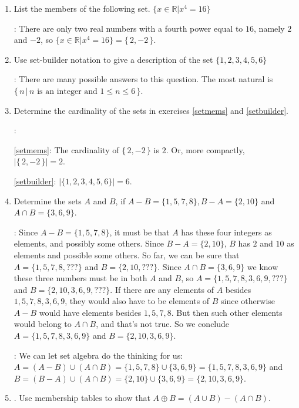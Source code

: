 \documentclass[11pt]{amsart}
\begin{document}
\begin{enumerate}

\item List the members of the following set.
 $\{x\in \mathbb{R} | x^4=16\}$\label{setmems}

: There are only two real numbers with a fourth power equal to $16$,
namely\hfill\break
 $2$ and $-2$, so $\{x\in \mathbb{R} | x^4=16\} = \{\,2, -2\,\}$.

\item Use set-builder notation to give a description of the set $\{1, 2, 3, 4, 5, 6\}$\label{setbuilder}

: There are many possible answers to this question. \hfill\break
The most natural is $\{\, n\,|\, n \text { is an integer and } 1\leq n \leq 6\,\}$.


\item Determine the cardinality of the sets in exercises \ref{setmems} and \ref{setbuilder}.

: 

\ref{setmems}: The cardinality of $\{\,2, -2\,\}$ is $2$. Or, more compactly,
$|\{\,2, -2\,\}| = 2$.

\ref{setbuilder}: $|\{1, 2, 3, 4, 5, 6\}| = 6$.

\item Determine the sets $A$ and $B$, if $A-B=\{1,5,7,8\}, B-A=\{2, 10\}$ and 
$A\cap B=\{3, 6, 9\}$.

: Since $A-B = \{ 1,5,7,8\}$, it must be that $A$ has 
these four integers as elements, and possibly some others. Since $B-A =
\{2,10\}$,  $B$ has $2$ and $10$ as elements and possible some others.
So far, we can be sure that $A = \{1,5,7,8, ???\}$ and $B=\{2,10,???\}$.
Since $A\cap B = \{3,6,9\}$ we know these three numbers must be in both
$A$ and $B$, so $A= \{1,5,7,8,3,6,9, ???\}$ and $B= \{2,10,3,6,9, ???\}$.
If there are any elements of $A$ besides $1,5,7,8,3,6,9$, they would also 
have to be elements of $B$ since otherwise $A-B$ would have elements
besides $1,5,7,8$. But then such other elements would belong to $A\cap B$,
and that's not true. So we conclude $A = \{1,5,7,8,3,6,9\}$ and $B=\{2,10,3,6,9\}$.

: We can let set algebra do the thinking for us:
 $A = (A-B)\cup(A\cap B) = \{1,5,7,8\}\cup\{3,6,9\} = \{1,5,7,8,3,6,9\}$ and
 $B = (B-A)\cup(A\cap B) = \{2,10\}\cup\{3,6,9\} = \{2,10,3,6,9\}$.

\item. Use membership tables to show that $A\oplus B=(A\cup B)-(A\cap B)$.


\end{enumerate}
\end{document}
